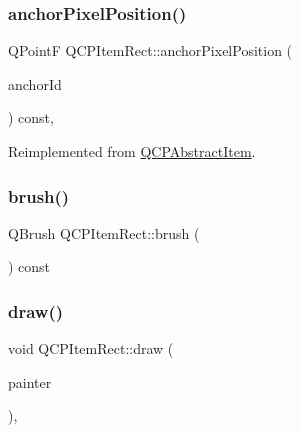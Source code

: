 \subsubsection{\texorpdfstring{anchor\+Pixel\+Position()}{anchorPixelPosition()}}
{\footnotesize\ttfamily Q\+PointF Q\+C\+P\+Item\+Rect\+::anchor\+Pixel\+Position (\begin{DoxyParamCaption}\item[{int}]{anchor\+Id }\end{DoxyParamCaption}) const\hspace{0.3cm}{\ttfamily [protected]}, {\ttfamily [virtual]}}



Reimplemented from \hyperlink{class_q_c_p_abstract_item_ada5bad4e1196c4fc0d0d12328e24b8f2}{Q\+C\+P\+Abstract\+Item}.

\mbox{\label{class_q_c_p_item_rect_a5071d7fd864428a1398152aca87b54ad}} 
\subsubsection{\texorpdfstring{brush()}{brush()}}
{\footnotesize\ttfamily Q\+Brush Q\+C\+P\+Item\+Rect\+::brush (\begin{DoxyParamCaption}{ }\end{DoxyParamCaption}) const\hspace{0.3cm}{\ttfamily [inline]}}

\mbox{\label{class_q_c_p_item_rect_a3c492960d0fc038cf1b60578b62b6cdc}} 
\subsubsection{\texorpdfstring{draw()}{draw()}}
{\footnotesize\ttfamily void Q\+C\+P\+Item\+Rect\+::draw (\begin{DoxyParamCaption}\item[{\hyperlink{class_q_c_p_painter}{Q\+C\+P\+Painter} $\ast$}]{painter }\end{DoxyParamCaption})\hspace{0.3cm}{\ttfamily [protected]}, {\ttfamily [virtual]}}



